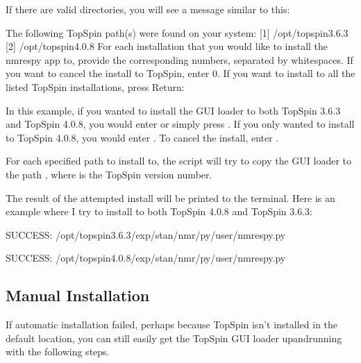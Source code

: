 \documentclass[letterpaper,10pt,english]{sphinxmanual}
\begin{document}
\sphinxAtStartPar
If there are valid directories, you will see a message similar to this:

\begin{sphinxVerbatim}[commandchars=\\\{\}]
The following TopSpin path(s) were found on your system:
    [1] /opt/topspin3.6.3
    [2] /opt/topspin4.0.8
For each installation that you would like to install the nmrespy app to,
provide the corresponding numbers, separated by whitespaces.
If you want to cancel the install to TopSpin, enter 0.
If you want to install to all the listed TopSpin installations, press \PYGZlt{}Return\PYGZgt{}:
\end{sphinxVerbatim}

\sphinxAtStartPar
In this example, if you wanted to install the GUI loader to both TopSpin 3.6.3
and TopSpin 4.0.8, you would enter  or simply press . If you
only wanted to install to TopSpin 4.0.8, you would enter . To cancel the
install, enter .

\sphinxAtStartPar
For each specified path to install to, the script will try to copy the GUI
loader to the path ,
where  is the TopSpin version number.

\sphinxAtStartPar
The result of the attempted install will be printed to the terminal. Here is
an example where I try to install to both TopSpin 4.0.8 and TopSpin 3.6.3:

\begin{sphinxVerbatim}[commandchars=\\\{\}]
SUCCESS:
    /opt/topspin3.6.3/exp/stan/nmr/py/user/nmrespy.py

SUCCESS:
    /opt/topspin4.0.8/exp/stan/nmr/py/user/nmrespy.py
\end{sphinxVerbatim}


\subsection{Manual Installation}
\label{\detokenize{gui/topspin_install:manual-installation}}
\sphinxAtStartPar
If automatic installation failed, perhaps because TopSpin isn’t installed in
the default location, you can still easily get the TopSpin GUI loader
up\sphinxhyphen{}and\sphinxhyphen{}running with the following steps.
\end{document}
